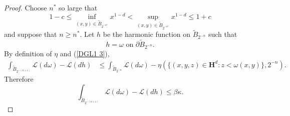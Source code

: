 \documentclass[reqno,12pt,letterpaper]{amsart}
\newcommand{\Hyp}{\mathbf H}
\newcommand{\Lagrange}{\mathscr L}
\theoremstyle{definition}
\numberwithin{equation}{section}
\begin{document}
\begin{proof}
Choose $n^*$ so large that
\begin{equation}\label{x to c}
1 - c \leq \inf_{(x, y) \in \tilde B_{2^{-n^*}}} x^{1 - d} < \sup_{(x, y) \in \tilde B_{2^{-n^*}}} x^{1 - d} \leq 1 + c
\end{equation}
and suppose that $n \geq n^*$.
Let $h$ be the harmonic function on $\tilde B_{2^{-n}}$ such that
\begin{equation}\label{trace equation}
h = \omega \text{ on } \partial \tilde B_{2^{-n}}.
\end{equation}
By definition of $\eta$ and (\ref{DGL1 3}),
\begin{align*}
\int_{\tilde B_{2^{-(n + 1)}}} \Lagrange(d\omega) - \Lagrange(dh)
&\leq \int_{\tilde B_{2^{-n}}} \Lagrange(d\omega) - \eta(\{(x, y, z) \in \Hyp^d: z < \omega(x, y)\}, 2^{-n}).
\end{align*}
Therefore
\begin{equation}\label{bound on domega - dh}
\int_{\tilde B_{2^{-(n + 1)}}} \Lagrange(d\omega) - \Lagrange(dh) \leq \beta\kappa.
\end{equation}


\end{proof}
\end{document}

